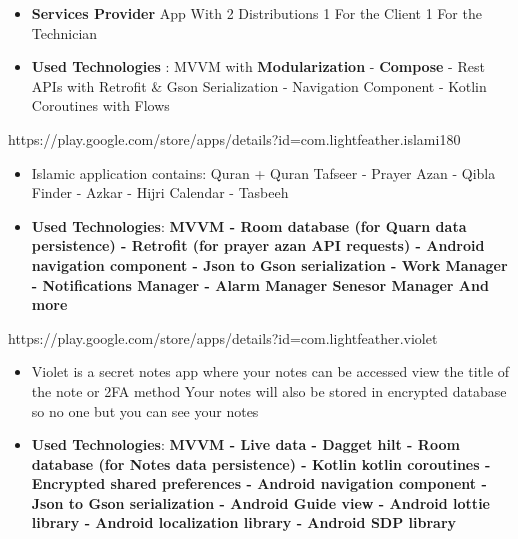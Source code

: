 \documentclass[10pt,a4paper,ragged2e,withhyper]{altacv}
\begin{document}
    \begin{paracol}{1}

        \begin{itemize}
            \item \textbf{Services Provider} App With 2 Distributions 1 For the Client 1 For the Technician
            \item \textbf{Used Technologies} : MVVM with \textbf{Modularization} - \textbf{Compose} - Rest APIs with Retrofit \& Gson Serialization - Navigation Component - Kotlin Coroutines with Flows
        \end{itemize}
        \divider

        {\cvrepo{|\faGooglePlay\faAndroid}
        {https://play.google.com/store/apps/details?id=com.lightfeather.islami180}}{}{}
        \begin{itemize}
            \item \textbf{}Islamic application contains:
            Quran + Quran Tafseer - Prayer Azan - Qibla Finder - Azkar - Hijri Calendar - Tasbeeh
            \item \textbf{Used Technologies}: \textbf{MVVM -
            Room database (for Quarn data persistence) -
            Retrofit (for prayer azan API requests) -
            Android navigation component -
            Json to Gson serialization -
            Work Manager -
            Notifications Manager -
            Alarm Manager
            Senesor Manager And more
            }
        \end{itemize}
        \divider

        {\cvrepo{|\faGithub\faAndroid\faGooglePlay}
        {https://play.google.com/store/apps/details?id=com.lightfeather.violet}}{}{}
        \begin{itemize}
            \item Violet is a secret notes app where your notes can be accessed view the title of the note or 2FA method Your notes will also be stored in encrypted database so no one but you can see your notes
            \item \textbf{Used Technologies}: \textbf{MVVM -
            Live data -
            Dagget hilt -
            Room database (for Notes data persistence) -
            Kotlin kotlin coroutines -
            Encrypted shared preferences -
            Android navigation component -
            Json to Gson serialization -
            Android Guide view -
            Android lottie library -
            Android localization library -
            Android SDP library}
        \end{itemize}
        \divider


\end{paracol}
\end{document}
